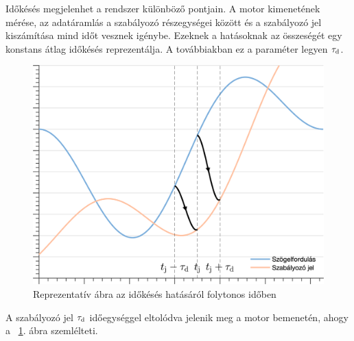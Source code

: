Időkésés megjelenhet a rendszer különböző pontjain. A motor kimenetének mérése, az adatáramlás 
a szabályozó részegységei között és a szabályozó jel kiszámítása mind időt vesznek igénybe. 
Ezeknek a hatásoknak az összeségét egy konstans átlag időkésés reprezentálja. A továbbiakban ez a 
paraméter legyen \(\tau_{\mathrm{d}}\).
\begin{figure}[ht]
    \begin{center}
    \includegraphics[width=12cm]{images/time_delay_example.png}
    \caption{Reprezentatív ábra az időkésés hatásáról folytonos időben}\label{fig:time_delay_example}
    \end{center}
\end{figure}
A szabályozó jel \(\tau_{\mathrm{d}}\) időegységgel eltolódva jelenik meg a motor bemenetén, ahogy a
~\ref{fig:time_delay_example}. ábra szemlélteti.

